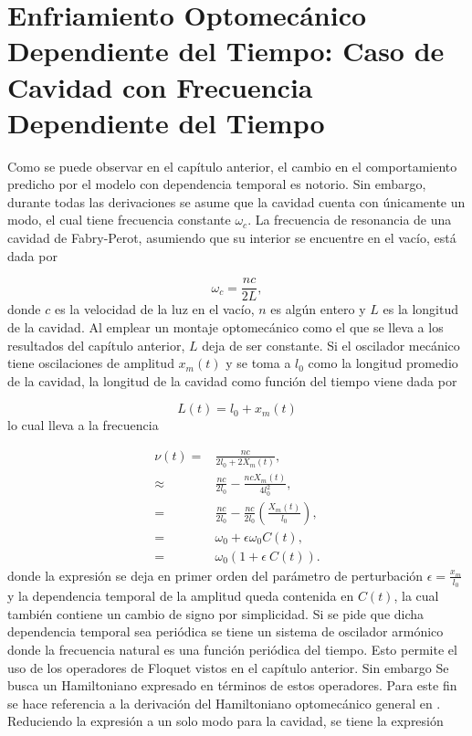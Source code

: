 \documentclass[10pt,a4paper]{report}
\begin{document}

\chapter{Enfriamiento Optomecánico Dependiente del Tiempo: Caso de Cavidad con Frecuencia Dependiente del Tiempo}

Como se puede observar en el capítulo anterior, el cambio en el comportamiento predicho por el modelo con dependencia temporal es notorio. Sin embargo, durante todas las derivaciones se asume que la cavidad cuenta con únicamente un modo, el cual tiene  frecuencia constante $\omega_c$. La frecuencia de resonancia de una cavidad de Fabry-Perot, asumiendo que su interior se encuentre en el vacío, está dada por

\begin{equation}
\omega_c = \frac{nc}{2L},
\end{equation} donde $c$ es la velocidad de la luz en el vacío, $n$ es algún entero y $L$ es la longitud de la cavidad. Al emplear un montaje optomecánico como el que se lleva a los resultados del capítulo anterior, $L$ deja de ser constante. Si el oscilador mecánico tiene oscilaciones de amplitud $x_m(t)$ y se toma a $l_0$ como la longitud promedio de la cavidad, la longitud de la cavidad como función del tiempo viene dada por

\begin{equation}
L(t) = l_0 + x_m(t)
\end{equation} lo cual lleva a la frecuencia 

\begin{align}
\nu(t) =& \frac{nc}{2l_0+2X_m(t)}, \\
\approx& \frac{nc}{2l_0} - \frac{nc X_m(t)}{4l_0^2}, \\
=& \frac{nc}{2l_0} - \frac{nc}{2l_0}(\frac{X_m(t)}{l_0}), \\
=& \omega_0 + \epsilon\omega_0C(t), \\
=& \omega_0(1+\epsilon\ C(t)).
\end{align} donde la expresión se deja en primer orden del parámetro de perturbación $\epsilon = \frac{x_m}{l_0}$ y la dependencia temporal de la amplitud queda contenida en $C(t)$, la cual también contiene un cambio de signo por simplicidad. Si se pide que dicha dependencia temporal sea periódica se tiene un sistema de oscilador armónico donde la frecuencia natural es una función periódica del tiempo. Esto permite el uso de los operadores de Floquet vistos en el capítulo anterior. Sin embargo Se busca un Hamiltoniano  expresado en términos de estos operadores. Para este fin se hace referencia a la derivación del Hamiltoniano optomecánico general en \cite{LawOH}. Reduciendo la expresión a un solo modo para la cavidad, se tiene la expresión
\end{document}
